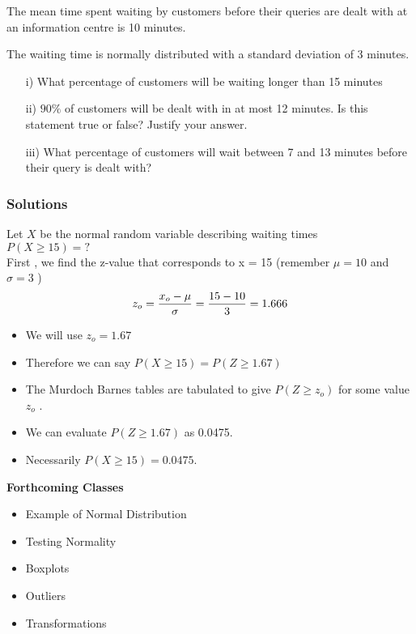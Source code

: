 \documentclass{beamer}
\begin{document}
\begin{frame}
	\large
	The mean time spent waiting by customers before their queries are dealt with at an information centre is 10 minutes.
	
	The waiting time is normally distributed with a standard deviation of 3 minutes.
	\begin{itemize}
		\item [i)] What percentage of customers will be waiting longer than 15 minutes
		
		\item [ii)] $90\%$ of customers will be dealt with in at most 12 minutes. Is this statement true or false?
		Justify your answer.
		
		\item [iii)] What percentage of customers will wait between 7 and 13 minutes before their query is dealt with?
	\end{itemize}
\end{frame}
\begin{frame}
	\frametitle{Solutions}
	\large
	Let $X$ be the normal random variable describing waiting times\\
	$P(X \geq 15) =?$ \\
	\bigskip
	First , we find the z-value that corresponds to x = 15  (remember $\mu=10$ and $\sigma=3$  )\\
	\[ z_o = { x_o - \mu \over \sigma }  = { 15 - 10 \over 3 } = 1.666 \]
	\begin{itemize}
		\item We will use $z_o =1.67$
		\item Therefore we can say $P(X \geq 15 ) = P(Z \geq 1.67)$
		\item The Murdoch Barnes tables are tabulated to give $P(Z \geq z_o)$ for some value $ z_o$ .
		\item We can evaluate $P(Z \geq 1.67)$  as 0.0475.
		\item Necessarily $P(X \geq 15) = 0.0475$.
	\end{itemize}
\end{frame}

\begin{frame}
	\Large
\textbf{Forthcoming Classes}
\begin{itemize}
\item Example of Normal Distribution
\item Testing Normality
\item Boxplots
\item Outliers
\item Transformations
\end{itemize}
\end{frame}
\end{document}
